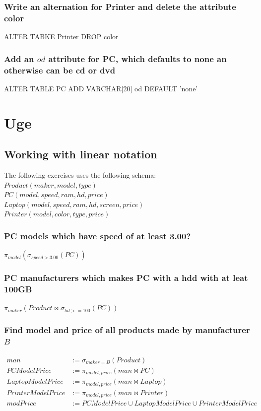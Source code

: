 \documentclass[12pt, a4paper]{article}
\begin{document}
				\subsubsection{Write an alternation for Printer and delete the attribute color}
					ALTER TABKE Printer DROP color 
				\subsubsection{Add an $od$ attribute for PC, which defaults to none an otherwise can be cd or dvd}
					ALTER TABLE PC ADD VARCHAR[20] od DEFAULT 'none'
		\section{Uge}
			\subsection{Working with linear notation}
				The following exercises uses the following schema:\\
				$Product(maker, model, type)$\\
				$PC(model, speed,ram, hd, price)$\\
				$Laptop(model, speed, ram, hd ,screen, price)$\\
				$Printer(model, color, type, price)$
				\subsubsection{PC models which have speed of at least 3.00?}
					$\pi_{model}(\sigma_{speed > 3.00}(PC))$
				\subsubsection{PC manufacturers which makes PC with a hdd with at leat 100GB}
					$\pi_{maker}(Product \bowtie \sigma_{hd >= 100}(PC))$
				\subsubsection{Find model and price of all products made by manufacturer $B$}
					\begin{align*}
						man &:= \sigma_{maker = B}(Product)\\
						PCModelPrice &:= \pi_{model, price}(man \bowtie PC)\\
						LaptopModelPrice &:= \pi_{model, price}(man \bowtie Laptop)\\
						PrinterModelPrice &:= \pi_{model, price}(man \bowtie Printer)\\
						modPrice &:= PCModelPrice \cup LaptopModelPrice \cup PrinterModelPrice
					\end{align*}
\end{document}

